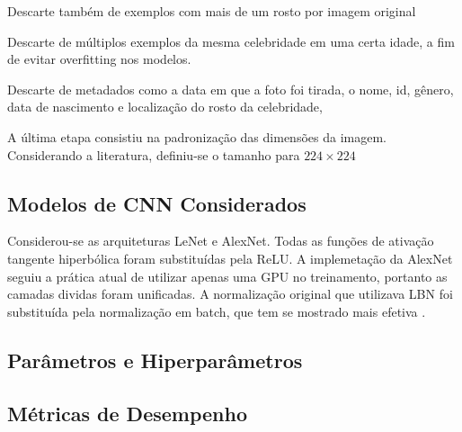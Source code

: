 Descarte também de exemplos com mais de um rosto por imagem original

Descarte de múltiplos exemplos da mesma celebridade em uma certa idade, a fim de evitar overfitting nos modelos.

Descarte de metadados como a data em que a foto foi tirada, o nome, id, gênero, data de nascimento e localização do rosto da celebridade,

A última etapa consistiu na padronização das dimensões da imagem. Considerando a literatura, definiu-se o tamanho para $224 \times 224$

\subsection{Modelos de CNN Considerados}
Considerou-se as arquiteturas LeNet e AlexNet. Todas as funções de ativação tangente hiperbólica foram substituídas pela ReLU. A implemetação da AlexNet seguiu a prática atual de utilizar apenas uma GPU no treinamento, portanto as camadas dividas foram unificadas. A normalização original que utilizava LBN foi substituída pela normalização em batch, que tem se mostrado mais efetiva .

\subsection{Parâmetros e Hiperparâmetros}

\subsection{Métricas de Desempenho}


